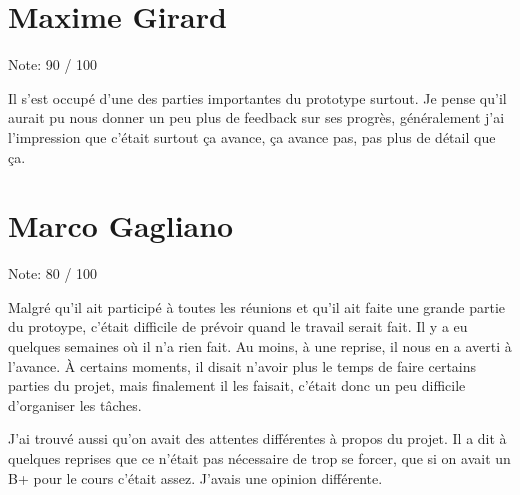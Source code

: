 \documentclass[11pt]{article} %
\begin{document}
\section{Maxime Girard}

{\LARGE Note: 90 / 100}

Il s'est occupé d'une des parties importantes du prototype surtout. Je pense qu'il aurait pu nous donner un
peu plus de feedback sur ses progrès, généralement j'ai l'impression que c'était surtout ça avance, ça avance pas, 
pas plus de détail que ça.


 
\section{Marco Gagliano} 
 
{\LARGE Note: 80 / 100}

Malgré qu'il ait participé à toutes les réunions et qu'il ait faite une grande partie du protoype, c'était
difficile de prévoir quand le travail serait fait. Il y a eu quelques semaines où il n'a rien fait. Au moins,
à une reprise, il nous en a averti à l'avance. À certains moments, il disait n'avoir plus le temps
de faire certains parties du projet, mais finalement il les faisait, c'était donc un peu difficile
d'organiser les tâches.

J'ai trouvé aussi qu'on avait des attentes différentes à propos du projet. Il a dit à quelques reprises
que ce n'était pas nécessaire de trop se forcer, que si on avait un B+ pour le cours c'était assez. J'avais
une opinion différente.
 
\end{document}
